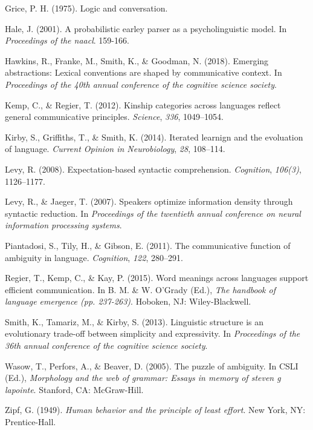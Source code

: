 \documentclass[10pt, letterpaper]{article}
\begin{document}
\hypertarget{ref-Grice1975a}{}
Grice, P. H. (1975). Logic and conversation.

\hypertarget{ref-Hale2001a}{}
Hale, J. (2001). A probabilistic earley parser as a psycholinguistic
model. In \emph{Proceedings of the naacl}. 159-166.

\hypertarget{ref-HawkinsFrankeSmithGoodman2018a}{}
Hawkins, R., Franke, M., Smith, K., \& Goodman, N. (2018). Emerging
abstractions: Lexical conventions are shaped by communicative context.
In \emph{Proceedings of the 40th annual conference of the cognitive
science society}.

\hypertarget{ref-KempRegier2012a}{}
Kemp, C., \& Regier, T. (2012). Kinship categories across languages
reflect general communicative principles. \emph{Science}, \emph{336},
1049--1054.

\hypertarget{ref-KirbyGriffithsSmith2014a}{}
Kirby, S., Griffiths, T., \& Smith, K. (2014). Iterated learnign and the
evoluation of language. \emph{Current Opinion in Neurobiology},
\emph{28}, 108--114.

\hypertarget{ref-Levy2008a}{}
Levy, R. (2008). Expectation-based syntactic comprehension.
\emph{Cognition}, \emph{106(3)}, 1126--1177.

\hypertarget{ref-LevyJaeger2007a}{}
Levy, R., \& Jaeger, T. (2007). Speakers optimize information density
through syntactic reduction. In \emph{Proceedings of the twentieth
annual conference on neural information processing systems}.

\hypertarget{ref-Piantadosi2011a}{}
Piantadosi, S., Tily, H., \& Gibson, E. (2011). The communicative
function of ambiguity in language. \emph{Cognition}, \emph{122},
280--291.

\hypertarget{ref-RegierKempKay2015a}{}
Regier, T., Kemp, C., \& Kay, P. (2015). Word meanings across languages
support efficient communication. In B. M. \& W. O'Grady (Ed.), \emph{The
handbook of language emergence (pp. 237-263)}. Hoboken, NJ:
Wiley-Blackwell.

\hypertarget{ref-SmithTamarizKirby2013a}{}
Smith, K., Tamariz, M., \& Kirby, S. (2013). Linguistic structure is an
evolutionary trade-off between simplicity and expressivity. In
\emph{Proceedings of the 36th annual conference of the cognitive science
society}.

\hypertarget{ref-WasowPerforsBeaver2005a}{}
Wasow, T., Perfors, A., \& Beaver, D. (2005). The puzzle of ambiguity.
In CSLI (Ed.), \emph{Morphology and the web of grammar: Essays in memory
of steven g lapointe}. Stanford, CA: McGraw-Hill.

\hypertarget{ref-Zipf1949a}{}
Zipf, G. (1949). \emph{Human behavior and the principle of least
effort}. New York, NY: Prentice-Hall.


\end{document}
